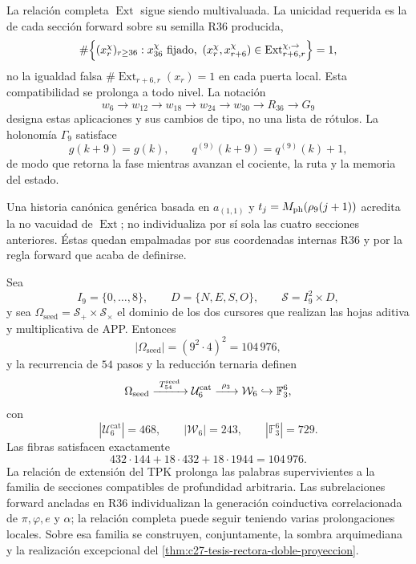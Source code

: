 La relación completa \(\operatorname{Ext}\) sigue siendo multivaluada. La
unicidad requerida es la de cada sección forward sobre su semilla R36
producida,
\[
 \#\Bigl\{(x_r^\chi)_{r\ge36}:x_{36}^\chi\text{ fijado},\ 
 (x_r^\chi,x_{r+6}^\chi)
 \in\operatorname{Ext}^{\chi,\rightarrow}_{r+6,r}\Bigr\}=1,
\]
no la igualdad falsa \(\#\operatorname{Ext}_{r+6,r}(x_r)=1\) en cada puerta
local. Esta compatibilidad se prolonga a todo nivel. La notación
\[
 w_6\longrightarrow w_{12}\longrightarrow w_{18}\longrightarrow w_{24}
 \longrightarrow w_{30}\longrightarrow R_{36}\longrightarrow G_9
\]
designa estas aplicaciones y sus cambios de tipo, no una lista de rótulos.
La holonomía \(\Gamma_9\) satisface
\[
 g(k+9)=g(k),
 \qquad q^{(9)}(k+9)=q^{(9)}(k)+1,
\]
de modo que retorna la fase mientras avanzan el cociente, la ruta y la
memoria del estado.

Una historia canónica genérica basada en \(a_{(1,1)}\) y
\(t_j=M_{\rm ph}(\rho_9(j+1))\) acredita la no vacuidad de
\(\operatorname{Ext}\); no individualiza por sí sola las cuatro secciones
anteriores. Éstas quedan empalmadas por sus coordenadas internas R36 y por la
regla forward que acaba de definirse.

\begin{theorem}
\label{thm:c27-construccion-inaugural-semillas}
Sea
\[
 I_9=\{0,\ldots,8\},\qquad D=\{N,E,S,O\},\qquad
 \mathcal S=I_9^2\times D,
\]
y sea \(\Omega_{\mathrm{seed}}=\mathcal S_+\times\mathcal S_\times\) el
dominio de los dos cursores que realizan las hojas aditiva y multiplicativa
de APP. Entonces
\[
 |\Omega_{\mathrm{seed}}|=(9^2\cdot4)^2=104\,976,
\]
y la recurrencia de \(54\) pasos y la reducción ternaria definen
\[
 \Omega_{\mathrm{seed}}
 \xrightarrow{\ T_{54}^{\rm seed}\ }
 \mathcal U_6^{\mathrm{cat}}
 \xrightarrow{\ \rho_3\ }
 \mathcal W_6
 \hookrightarrow\mathbb F_3^6,
\]
con
\[
 |\mathcal U_6^{\mathrm{cat}}|=468,
 \qquad |\mathcal W_6|=243,
 \qquad |\mathbb F_3^6|=729.
\]
Las fibras satisfacen exactamente
\[
 432\cdot144+18\cdot432+18\cdot1944=104\,976.
\]
La relación de extensión del TPK prolonga las palabras supervivientes a la
familia de secciones compatibles de profundidad arbitraria. Las subrelaciones
forward ancladas en R36 individualizan la generación coinductiva
correlacionada de \(\pi,\varphi,e\) y \(\alpha\); la relación completa puede
seguir teniendo varias prolongaciones locales. Sobre esa familia se
construyen, conjuntamente, la sombra arquimediana y la realización
excepcional del \cref{thm:c27-tesis-rectora-doble-proyeccion}.
\end{theorem}

